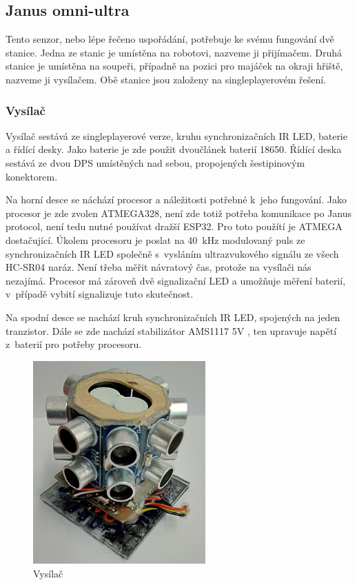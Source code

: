 \subsection{Janus omni-ultra}
Tento senzor, nebo lépe řečeno uspořádání, potřebuje ke svému fungování dvě stanice.
Jedna ze stanic je umístěna na robotovi, nazveme ji přijímačem.
Druhá stanice je umístěna na soupeři, případně na pozici pro majáček na okraji hřiště, nazveme ji vysílačem.
Obě stanice jsou založeny na singleplayerovém řešení.

\subsubsection{Vysílač}
Vysílač sestává ze singleplayerové verze, kruhu synchronizačních IR LED, baterie a řídící desky.
Jako baterie je zde použit dvoučlánek baterií 18650.
Řídící deska sestává ze dvou DPS umístěných nad sebou, propojených šestipinovým konektorem.

Na horní desce se náchází procesor a náležitosti potřebné k~jeho fungování.
Jako procesor je zde zvolen ATMEGA328\cite{atmega}, není zde totiž potřeba komunikace po Janus protocol, není tedu nutné používat dražší ESP32.
Pro toto použítí je ATMEGA dostačující.
Úkolem procesoru je poslat na 40~kHz modulovaný puls ze synchronizačních IR LED společně s~vysláním ultrazvukového signálu ze všech HC-SR04 naráz. 
Není třeba měřit návratový čas, protože na vysílači nás nezajímá.
Procesor má zároveň dvě signalizační LED a umožňuje měření baterií, v~případě vybití signalizuje tuto skutečnost.

Na spodní desce se nachází kruh synchronizačních IR LED, spojených na jeden tranzistor.
Dále se zde nachází stabilizátor AMS1117 5V \cite{ams1117}, ten upravuje napětí z~baterií pro potřeby procesoru.

\begin{figure}
    \begin{small}
        \begin{center}
            \includegraphics[width=250px, angle = 0, scale = 0.7]{img/Vysilac2.jpg}
        \end{center}
        \caption{Vysílač}
        \label{fig: Ultrasonic}
    \end{small}
\end{figure}


